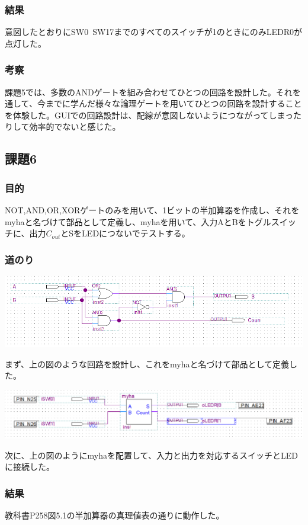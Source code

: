 \documentclass[a4paper]{jarticle}
\begin{document}
\subsubsection{結果}
意図したとおりにSW0~SW17までのすべてのスイッチが1のときにのみLEDR0が点灯した。
\subsubsection{考察}
課題5では、多数のANDゲートを組み合わせてひとつの回路を設計した。それを通して、今までに学んだ様々な論理ゲートを用いてひとつの回路を設計することを体験した。GUIでの回路設計は、配線が意図しないようにつながってしまったりして効率的でないと感じた。
\subsection{課題6}
\subsubsection{目的}
NOT,AND,OR,XORゲートのみを用いて、1ビットの半加算器を作成し、それをmyhaと名づけて部品として定義し、myhaを用いて、入力AとBをトグルスイッチに、出力$C_{out}$とSをLEDにつないでテストする。
\subsubsection{道のり}
\begin{center}
	\includegraphics[width=15cm]{work6.PNG}
\end{center}
まず、上の図のような回路を設計し、これをmyhaと名づけて部品として定義した。
\begin{center}
	\includegraphics[width=15cm]{work6main.PNG}
\end{center}
次に、上の図のようにmyhaを配置して、入力と出力を対応するスイッチとLEDに接続した。
\subsubsection{結果}
教科書P258図5.1の半加算器の真理値表の通りに動作した。
\end{document}
